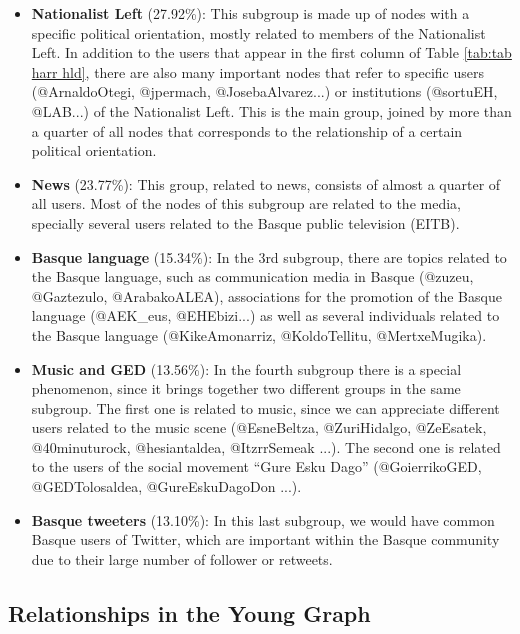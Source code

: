 \documentclass[information,article,submit,moreauthors,pdftex,10pt,a4paper]{Definitions/mdpi}
\begin{document}
\begin{itemize}

\item \textbf{Nationalist Left} (27.92\%): This subgroup is made up of nodes with a specific political orientation, mostly related to members of the Nationalist Left. In addition to the users that appear in the first column of Table \ref{tab:tab harr hld}, there are also many important nodes that refer to specific users (@ArnaldoOtegi, @jpermach, @JosebaAlvarez...) or institutions (@sortuEH, @LAB...) of the Nationalist Left. This is the main group, joined by more than a quarter of all nodes that corresponds to the relationship of a certain political orientation.

\item \textbf{News} (23.77\%): This group, related to news, consists of almost a quarter of all users. Most of the nodes of this subgroup are related to the media, specially several users related to the Basque public television (EITB).

\item \textbf{Basque language} (15.34\%): In the 3rd subgroup, there are topics related to the Basque language, such as communication media in Basque (@zuzeu, @Gaztezulo, @ArabakoALEA), associations for the promotion of the Basque language (@AEK\_eus, @EHEbizi...) as well as several individuals related to the Basque language (@KikeAmonarriz, @KoldoTellitu, @MertxeMugika).

\item \textbf{Music and GED} (13.56\%): In the fourth subgroup there is a special phenomenon, since it brings together two different groups in the same subgroup. The first one is related to music, since we can appreciate different users related to the music scene (@EsneBeltza, @ZuriHidalgo, @ZeEsatek, @40minuturock, @hesiantaldea, @ItzrrSemeak ...). The second one is related to the users of the social movement ``Gure Esku Dago'' (@GoierrikoGED, @GEDTolosaldea, @GureEskuDagoDon ...).

\item \textbf{Basque tweeters} (13.10\%): In this last subgroup, we would have common Basque users of Twitter, which are important within the Basque community due to their large number of follower or retweets.
\end{itemize}

\subsection{Relationships in the Young Graph}\label{sec:relat-young-subgr}
\end{document}
